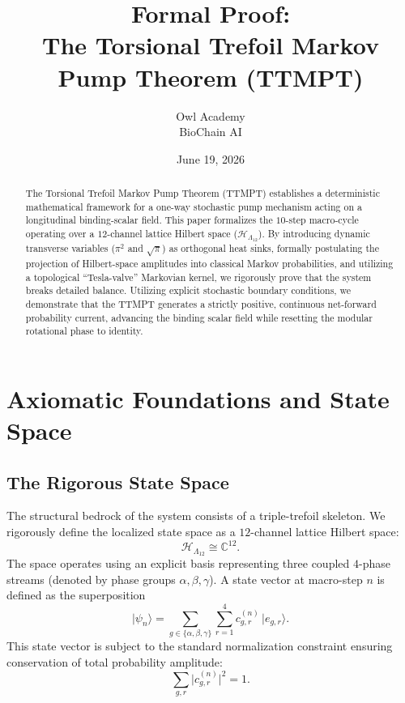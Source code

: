 \documentclass[11pt]{article}
\theoremstyle{plain}
\theoremstyle{definition}
\newcommand{\Hilb}{\mathcal{H}}
\newcommand{\ket}[1]{\lvert #1 \rangle}
\begin{document}
\title{\bfseries Formal Proof:\\[2pt]
       The Torsional Trefoil Markov Pump Theorem (TTMPT)}
\author{Owl Academy \\[2pt] \normalsize BioChain AI}
\date{June 19, 2026}
\maketitle
\thispagestyle{fancy}

\begin{abstract}
\noindent
The Torsional Trefoil Markov Pump Theorem (TTMPT) establishes a deterministic
mathematical framework for a one-way stochastic pump mechanism acting on a
longitudinal binding-scalar field. This paper formalizes the $10$-step
macro-cycle operating over a $12$-channel lattice Hilbert space
($\Hilb_{\Lambda_{12}}$). By introducing dynamic transverse variables
($\pi^{2}$ and $\sqrt{\pi}$) as orthogonal heat sinks, formally postulating the
projection of Hilbert-space amplitudes into classical Markov probabilities, and
utilizing a topological ``Tesla-valve'' Markovian kernel, we rigorously prove
that the system breaks detailed balance. Utilizing explicit stochastic boundary
conditions, we demonstrate that the TTMPT generates a strictly positive,
continuous net-forward probability current, advancing the binding scalar field
while resetting the modular rotational phase to identity.
\end{abstract}

\section{Axiomatic Foundations and State Space}

\subsection{The Rigorous State Space}
The structural bedrock of the system consists of a triple-trefoil skeleton. We
rigorously define the localized state space as a $12$-channel lattice Hilbert
space:
\[
  \Hilb_{\Lambda_{12}} \cong \mathbb{C}^{12}.
\]
The space operates using an explicit basis representing three coupled $4$-phase
streams (denoted by phase groups $\alpha,\beta,\gamma$). A state vector at
macro-step $n$ is defined as the superposition
\[
  \ket{\psi_n}
    = \sum_{g \in \{\alpha,\beta,\gamma\}} \sum_{r=1}^{4}
      c_{g,r}^{(n)}\, \ket{e_{g,r}}.
\]
This state vector is subject to the standard normalization constraint ensuring
conservation of total probability amplitude:
\[
  \sum_{g,r} \bigl\lvert c_{g,r}^{(n)} \bigr\rvert^{2} = 1.
\]
\end{document}
